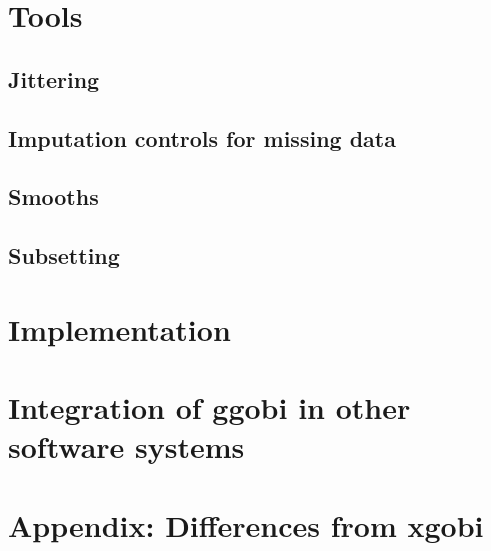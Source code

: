 \documentclass{article}
\begin{document}
\section{Tools}
\subsection{Jittering}
\subsection{Imputation controls for missing data}
\subsection{Smooths}
\subsection{Subsetting}

\section{Implementation}
\section{Integration of ggobi in other software systems}

\section{Appendix: Differences from xgobi}

\end{document}
